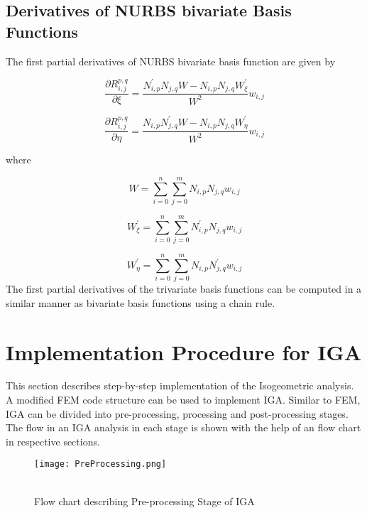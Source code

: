 \documentclass[11pt]{article}
\begin{document}
\subsection{Derivatives of NURBS bivariate Basis Functions}
The first partial derivatives of NURBS bivariate basis function are given by \cite{nguyen2012introduction}

\begin{equation}
\frac{\partial R_{i,j}^{p,q}}{\partial \xi} = \frac{N^{'}_{i,p} N_{j,q} W -
	N_{i,p} N_{j,q} W^{'}_{\xi}}{W^2}w_{i,j}
\end{equation}

\begin{equation}
\frac{\partial R_{i,j}^{p,q}}{\partial \eta} = \frac{N_{i,p} N^{'}_{j,q} W -
	N_{i,p} N_{j,q} W^{'}_{\eta}}{W^2}w_{i,j}
\end{equation}

\noindent
where

\begin{equation}
W = \sum_{i=0}^{n}\sum_{j=0}^{m}N_{i,p} N_{j,q}w_{i,j}
\end{equation}

\begin{equation}
W^{'}_{\xi} = \sum_{i=0}^{n}\sum_{j=0}^{m}N^{'}_{i,p} N_{j,q}w_{i,j}
\end{equation}

\begin{equation}
W^{'}_{\eta} = \sum_{i=0}^{n}\sum_{j=0}^{m}N_{i,p} N^{'}_{j,q}w_{i,j}
\end{equation}
The first partial derivatives of the trivariate basis functions can be computed
in a similar manner as bivariate basis functions using a chain rule.



\section{Implementation Procedure for IGA}
This section describes step-by-step implementation of the Isogeometric analysis.
A modified FEM code structure can be used to implement IGA. Similar to FEM, IGA
can be divided into pre-processing, processing and post-processing stages. The
flow in an IGA analysis in each stage is shown with the help of an flow chart in respective sections.

\begin{figure}[H]
	\begin{center}
		\texttt{[image: PreProcessing.png]} 
		\caption{\\Flow chart describing Pre-processing Stage of IGA}\label{PreProcessing}
	\end{center}
	
\end{figure}
\end{document}
